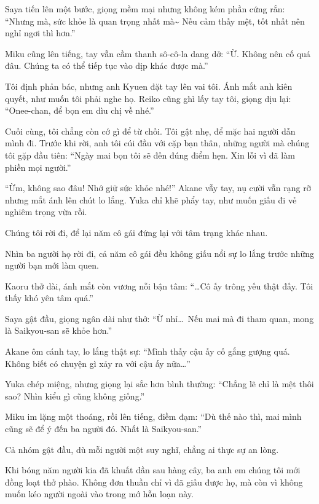 \documentclass[../main.tex]{subfiles}
\begin{document}
Saya tiến lên một bước, giọng mềm mại nhưng không kém phần cứng rắn: ``Nhưng mà, sức khỏe là quan trọng nhất mà\~{} Nếu cảm thấy mệt, tốt nhất nên nghỉ ngơi thì hơn.''

Miku cũng lên tiếng, tay vẫn cầm thanh sô-cô-la dang dở: ``Ừ. Không nên cố quá đâu. Chúng ta có thể tiếp tục vào dịp khác được mà.''

Tôi định phản bác, nhưng anh Kyuen đặt tay lên vai tôi. Ánh mắt anh kiên quyết, như muốn tôi phải nghe họ. Reiko cũng ghì lấy tay tôi, giọng dịu lại: ``Onee-chan, để bọn em dìu chị về nhé.''

Cuối cùng, tôi chẳng còn cớ gì để từ chối. Tôi gật nhẹ, để mặc hai người dẫn mình đi. Trước khi rời, anh tôi cúi đầu với cặp bạn thân, những người mà chúng tôi gặp đầu tiên: ``Ngày mai bọn tôi sẽ đến đúng điểm hẹn. Xin lỗi vì đã làm phiền mọi người.''

``Ừm, không sao đâu! Nhớ giữ sức khỏe nhé!'' Akane vẫy tay, nụ cười vẫn rạng rỡ nhưng mắt ánh lên chút lo lắng. Yuka chỉ khẽ phẩy tay, như muốn giấu đi vẻ nghiêm trọng vừa rồi.

Chúng tôi rời đi, để lại năm cô gái đứng lại với tâm trạng khác nhau.

\pov{-}

Nhìn ba người họ rời đi, cả năm cô gái đều không giấu nổi sự lo lắng trước những người bạn mới làm quen.

Kaoru thở dài, ánh mắt còn vương nỗi bận tâm: ``\dots Cô ấy trông yếu thật đấy. Tôi thấy khó yên tâm quá.''

Saya gật đầu, giọng ngân dài như thở: ``Ừ nhỉ\dots\ Nếu mai mà đi tham quan, mong là Saikyou-san sẽ khỏe hơn.''

Akane ôm cánh tay, lo lắng thật sự:
``Mình thấy cậu ấy cố gắng gượng quá. Không biết có chuyện gì xảy ra với cậu ấy nữa\dots''

Yuka chép miệng, nhưng giọng lại sắc hơn bình thường: ``Chẳng lẽ chỉ là mệt thôi sao? Nhìn kiểu gì cũng không giống.''

Miku im lặng một thoáng, rồi lên tiếng, điềm đạm: ``Dù thế nào thì, mai mình cũng sẽ để ý đến ba người đó. Nhất là Saikyou-san.''

Cả nhóm gật đầu, dù mỗi người một suy nghĩ, chẳng ai thực sự an lòng.


Khi bóng năm người kia đã khuất dần sau hàng cây, ba anh em chúng tôi mới đồng loạt thở phào. Không đơn thuần chỉ vì đã giấu được họ, mà còn vì không muốn kéo người ngoài vào trong mớ hỗn loạn này.
\end{document}
